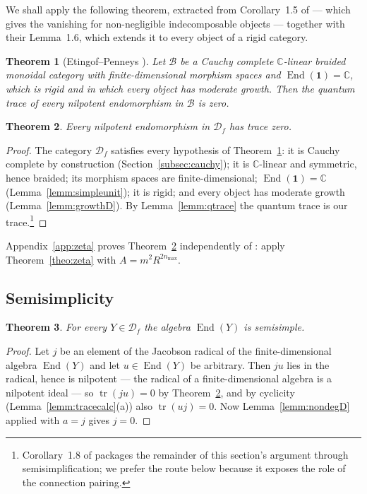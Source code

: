 \documentclass[11pt]{article}
\newtheorem{theo}{Theorem}[section]
\newcommand{\cauchy}{\mathcal{D}_{f}}             %
\newcommand{\unitobj}{\mathbf{1}}                 %
\newcommand{\End}{\operatorname{End}}
\newcommand{\tr}{\operatorname{tr}}
\begin{document}
We shall apply the following theorem, extracted from
Corollary~1.5 of \cite{EP26} --- which gives the vanishing for
non-negligible indecomposable objects --- together with their
Lemma~1.6, which extends it to every object of a rigid category.

\begin{theo}[{Etingof--Penneys \cite[Cor.~1.5,
Lem.~1.6]{EP26}}]\label{theo:EP}
Let $\mathcal{B}$ be a Cauchy complete $\mathbb{C}$-linear braided
monoidal category with finite-dimensional morphism spaces and
$\End(\unitobj)=\mathbb{C}$, which is rigid and in which every
object has moderate growth. Then the quantum trace of every
nilpotent endomorphism in $\mathcal{B}$ is zero.
\end{theo}

\begin{theo}\label{theo:niltrace}
Every nilpotent endomorphism in $\cauchy$ has trace zero.
\end{theo}

\begin{proof}
The category $\cauchy$ satisfies every hypothesis of
Theorem~\ref{theo:EP}: it is Cauchy complete by construction
(Section~\ref{subsec:cauchy}); it is $\mathbb{C}$-linear and
symmetric, hence braided; its morphism spaces are
finite-dimensional; $\End(\unitobj)=\mathbb{C}$
(Lemma~\ref{lemm:simpleunit}); it is rigid; and every object has
moderate growth (Lemma~\ref{lemm:growthD}). By
Lemma~\ref{lemm:qtrace} the quantum trace is our trace.\footnote{%
Corollary~1.8 of \cite{EP26} packages the remainder of this
section's argument through semisimplification; we prefer the route
below because it exposes the role of the connection pairing.}
\end{proof}

Appendix~\ref{app:zeta} proves Theorem~\ref{theo:niltrace}
independently of \cite{EP26}: apply Theorem~\ref{theo:zeta} with
$A=m^{2}R^{2n_{\max}}$.

\subsection{Semisimplicity}\label{subsec:semisimplicity}

\begin{theo}\label{theo:radical}
For every $Y\in\cauchy$ the algebra $\End(Y)$ is semisimple.
\end{theo}

\begin{proof}
Let $j$ be an element of the Jacobson radical of the
finite-dimensional algebra $\End(Y)$ and let $u\in\End(Y)$ be
arbitrary. Then $ju$ lies in the radical, hence is nilpotent ---
the radical of a finite-dimensional algebra is a nilpotent ideal
--- so $\tr(ju)=0$ by Theorem~\ref{theo:niltrace}, and by cyclicity
(Lemma~\ref{lemm:tracecalc}(a)) also $\tr(uj)=0$. Now
Lemma~\ref{lemm:nondegD} applied with $a=j$ gives $j=0$.
\end{proof}
\end{document}
